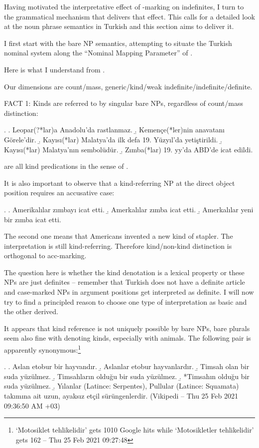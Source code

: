 \documentclass[11pt,a4paper]{article}
\begin{document}
Having motivated the interpretative effect of \acc-marking on indefinites, I turn to the grammatical mechanism that delivers that effect. This calls for a detailed look at the noun phrase semantics in Turkish and this section aims to deliver it.

I first start with the bare NP semantics, attempting to situate the Turkish nominal system along the ``Nominal Mapping Parameter''  of  .

Here is what I understand from . 

Our dimensions are count/mass, generic/kind/weak indefinite/indefinite/definite.

FACT 1: Kinds are referred to by singular bare NPs, regardless of count/mass distinction:

\ex.
\a. Leopar(?*lar)a Anadolu'da rastlanmaz.
\b. Kemençe(*ler)nin anavatanı Görele'dir.
\b. Kayısı(*lar) Malatya'da ilk defa 19. Yüzyıl'da yetiştirildi. 
\b. Kayısı(*lar) Malatya'nın sembolüdür.
\b. Zımba(*lar) 19. yy'da ABD'de icat edildi.

are all kind predications in the sense of .

It is also important to observe that a kind-referring NP at the direct object position requires an accusative case:

\ex.
\a. Amerikalılar zımbayı icat etti.
\b. Amerkalılar zımba icat etti.
\b. Amerkalılar yeni bir zımba icat etti.

The second one means that Americans invented a new kind of stapler. The interpretation is still kind-referring. Therefore kind/non-kind distinction is orthogonal to acc-marking.

The question here is whether the kind denotation is a lexical property or these NPs are just definites -- remember that Turkish does not have a definite article and case-marked NPs in argument positions get interpreted as definite. I will now try to find a principled reason to choose one type of interpretation as basic and the other derived.

It appears that kind reference is not uniquely possible by bare NPs, bare plurals seem also fine with denoting kinds, especially with animals. The following pair is apparently synonymous:\footnote{`Motosiklet tehlikelidir' gets 1010 Google hits while `Motosikletler tehlikelidir' gets 162 -- Thu 25 Feb 2021 09:27:48}


\ex.
\a. Aslan etobur bir hayvandır.
\b. Aslanlar etobur hayvanlardır.
\b. Timsah olan bir suda yüzülmez.
\b. Timsahların olduğu bir suda yüzülmez.
\b. *Timsahın olduğu bir suda yüzülmez.
\b. Yılanlar (Latince: Serpentes), Pullular (Latince: Squamata) takımına ait uzun, ayaksız etçil sürüngenlerdir. (Vikipedi -- Thu 25 Feb 2021 09:36:50 AM +03)
\end{document}
